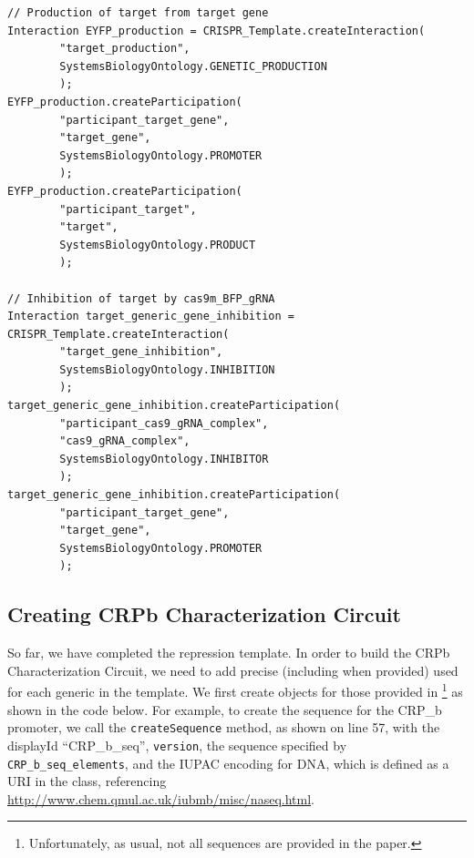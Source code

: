 \vspace{\abovedisplayskip}
\begin{minipage}{0.95\textwidth}%
\begin{lstlisting}
// Production of target from target gene
Interaction EYFP_production = CRISPR_Template.createInteraction(
        "target_production", 
        SystemsBiologyOntology.GENETIC_PRODUCTION
        );
EYFP_production.createParticipation(
        "participant_target_gene", 
        "target_gene",
        SystemsBiologyOntology.PROMOTER
        );
EYFP_production.createParticipation(
        "participant_target", 
        "target",
        SystemsBiologyOntology.PRODUCT
        );
	
// Inhibition of target by cas9m_BFP_gRNA 
Interaction target_generic_gene_inhibition = CRISPR_Template.createInteraction(
        "target_gene_inhibition", 
        SystemsBiologyOntology.INHIBITION
        );
target_generic_gene_inhibition.createParticipation(
        "participant_cas9_gRNA_complex", 
        "cas9_gRNA_complex",
        SystemsBiologyOntology.INHIBITOR
        );
target_generic_gene_inhibition.createParticipation(
        "participant_target_gene", 
        "target_gene",
        SystemsBiologyOntology.PROMOTER
        );
\end{lstlisting}
\end{minipage}

\subsection*{Creating CRPb Characterization Circuit}
So far, we have completed the repression template. In order to build the CRPb Characterization Circuit, we need to add precise (including  when provided)  used for each generic  in the template. We first create  objects for those provided in \cite{kiani2014crispr}\footnote{Unfortunately, as usual, not all sequences are provided in the paper.} as shown in the code below. For example, to create the sequence for the CRP\_b promoter, we call the \lstinline+createSequence+ method, as shown on line 57, with the displayId ``CRP\_b\_seq'', \lstinline+version+, the sequence specified by \lstinline+CRP_b_seq_elements+, and the IUPAC encoding for DNA, which is defined as a URI in the  class, referencing \url{http://www.chem.qmul.ac.uk/iubmb/misc/naseq.html}.

